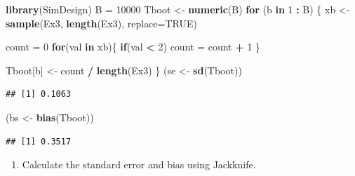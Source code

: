 \documentclass[
]{article}
\newenvironment{Shaded}{\begin{snugshade}}{\end{snugshade}}
\newcommand{\ControlFlowTok}[1]{\textcolor[rgb]{0.13,0.29,0.53}{\textbf{#1}}}
\newcommand{\DataTypeTok}[1]{\textcolor[rgb]{0.13,0.29,0.53}{#1}}
\newcommand{\DecValTok}[1]{\textcolor[rgb]{0.00,0.00,0.81}{#1}}
\newcommand{\KeywordTok}[1]{\textcolor[rgb]{0.13,0.29,0.53}{\textbf{#1}}}
\newcommand{\NormalTok}[1]{#1}
\newcommand{\OperatorTok}[1]{\textcolor[rgb]{0.81,0.36,0.00}{\textbf{#1}}}
\newcommand{\OtherTok}[1]{\textcolor[rgb]{0.56,0.35,0.01}{#1}}
\newcommand{\StringTok}[1]{\textcolor[rgb]{0.31,0.60,0.02}{#1}}
\providecommand{\tightlist}{%
  \setlength{\itemsep}{0pt}\setlength{\parskip}{0pt}}
\begin{document}
\begin{Shaded}
\begin{Highlighting}[]
\KeywordTok{library}\NormalTok{(SimDesign)}
\NormalTok{B =}\StringTok{ }\DecValTok{10000}
\NormalTok{Tboot <-}\StringTok{ }\KeywordTok{numeric}\NormalTok{(B)}
\ControlFlowTok{for}\NormalTok{ (b }\ControlFlowTok{in} \DecValTok{1} \OperatorTok{:}\StringTok{ }\NormalTok{B) \{}
\NormalTok{  xb <-}\StringTok{ }\KeywordTok{sample}\NormalTok{(Ex3, }\KeywordTok{length}\NormalTok{(Ex3), }\DataTypeTok{replace=}\OtherTok{TRUE}\NormalTok{)}
  
\NormalTok{  count =}\StringTok{ }\DecValTok{0}
  \ControlFlowTok{for}\NormalTok{(val }\ControlFlowTok{in}\NormalTok{ xb)\{}
    \ControlFlowTok{if}\NormalTok{(val }\OperatorTok{<}\StringTok{ }\DecValTok{2}\NormalTok{) count =}\StringTok{ }\NormalTok{count }\OperatorTok{+}\StringTok{ }\DecValTok{1}
\NormalTok{  \}}
  
\NormalTok{  Tboot[b] <-}\StringTok{ }\NormalTok{count }\OperatorTok{/}\StringTok{ }\KeywordTok{length}\NormalTok{(Ex3)}
\NormalTok{\}}
\NormalTok{(se <-}\StringTok{ }\KeywordTok{sd}\NormalTok{(Tboot))}
\end{Highlighting}
\end{Shaded}

\begin{verbatim}
## [1] 0.1063
\end{verbatim}

\begin{Shaded}
\begin{Highlighting}[]
\NormalTok{(bs <-}\StringTok{ }\KeywordTok{bias}\NormalTok{(Tboot))}
\end{Highlighting}
\end{Shaded}

\begin{verbatim}
## [1] 0.3517
\end{verbatim}

\begin{enumerate}
\def\labelenumi{\arabic{enumi}.}
\setcounter{enumi}{2}
\tightlist
\item
  Calculate the standard error and bias using Jackknife.
\end{enumerate}
\end{document}

